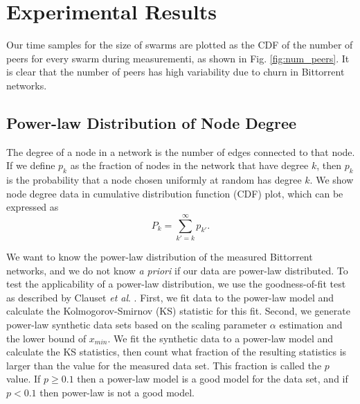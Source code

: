 \documentclass[paper]{ieice}
\begin{document}
\section{Experimental Results}\label{result}
Our time samples for the size of swarms are plotted as the CDF of the number of peers for every swarm during measurementi, as shown in Fig. \ref{fig:num_peers}. 
It is clear that the number of peers has  high variability due to churn in Bittorrent networks. 

\subsection{Power-law Distribution of Node Degree}
The degree of a node in a network is the number of edges connected to that node. 
If we define $p_k$ as the  fraction of nodes in the network that have degree $k$, then $p_k$ is the probability that a node chosen uniformly at random has degree $k$. 
We show node degree data in cumulative distribution function (CDF) plot, which can be expressed as
\begin{equation}
P_k = \sum_{k'=k}^{\infty} p_{k'}.
\end{equation}

We want to know the power-law distribution of the measured Bittorrent networks, and we do not know \textit{a priori} if our data are power-law distributed.
To test the applicability of a power-law distribution, we use the goodness-of-fit test as described by Clauset \textit{et al}. \cite{clauset2009power}. 
First, we fit data to the power-law model and calculate the Kolmogorov-Smirnov (KS) statistic for this fit. 
Second, we generate power-law synthetic data sets based on the scaling parameter $\alpha$ estimation and the lower bound of $x_{min}$. 
We fit the synthetic data to a power-law model and calculate the KS statistics, then count what fraction of the resulting statistics is larger than the value for the measured data set. 
This fraction is called the $p$ value.  
If $p \geq 0.1$ then a power-law model is a good model for the data set, and if $p < 0.1$ then power-law is not a good model.
\end{document}
